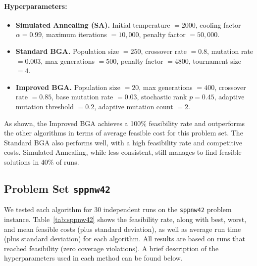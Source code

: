 \documentclass[12pt]{article}
\begin{document}
\paragraph{Hyperparameters:}
\vspace{-1em}
\begin{itemize}
    \item \textbf{Simulated Annealing (SA).} 
    Initial temperature $= 2000$, 
    cooling factor $\alpha = 0.99$, 
    maximum iterations $= 10,000$, 
    penalty factor $= 50,000$. 
    \item \textbf{Standard BGA.}
    Population size $= 250$, 
    crossover rate $= 0.8$, 
    mutation rate $= 0.003$, 
    max generations $= 500$, 
    penalty factor $= 4800$, 
    tournament size $= 4$.
    \item \textbf{Improved BGA.}
    Population size $= 20$, 
    max generations $= 400$, 
    crossover rate $= 0.85$, 
    base mutation rate $= 0.03$, 
    stochastic rank $p = 0.45$, 
    adaptive mutation threshold $= 0.2$, 
    adaptive mutation count $= 2$.
\end{itemize}

\noindent
As shown, the Improved BGA achieves a 100\% feasibility rate and outperforms the other algorithms in terms of average feasible cost for this problem set. The Standard BGA also performs well, with a high feasibility rate and competitive costs. Simulated Annealing, while less consistent, still manages to find feasible solutions in 40\% of runs.


\subsection{Problem Set \texttt{sppnw42}}
\label{subsec:sppnw42}

We tested each algorithm for 30 independent runs on the \texttt{sppnw42} problem instance. 
Table~\ref{tab:sppnw42} shows the feasibility rate, along with best, worst, and mean feasible costs (plus standard deviation), as well as average run time (plus standard deviation) for each algorithm. 
All results are based on runs that reached feasibility (zero coverage violations). 
A brief description of the hyperparameters used in each method can be found below.

\vspace{1em}
\end{document}
